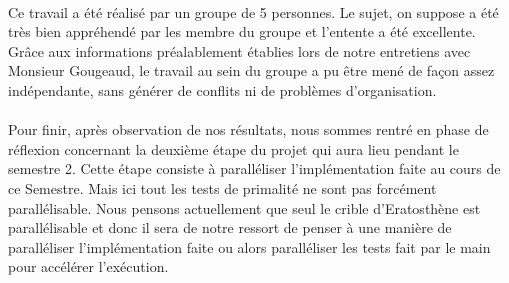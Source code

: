 		\paragraph{} Ce travail a été réalisé par un groupe de 5 personnes. Le sujet, on suppose a été très bien appréhendé par les membre du groupe et l'entente a été excellente. Grâce aux informations préalablement établies lors de notre entretiens avec Monsieur Gougeaud, le travail au sein du groupe a pu être mené de façon assez indépendante, sans générer de conflits ni de problèmes d'organisation.		
		\paragraph{} Pour finir, après observation de nos résultats, nous sommes rentré en phase de réflexion concernant la deuxième étape du projet qui aura lieu pendant le semestre 2. Cette étape consiste à paralléliser l'implémentation faite au cours de ce Semestre. Mais ici tout les tests de primalité ne sont pas forcément parallélisable. Nous pensons actuellement que seul le crible d'Eratosthène est parallélisable et donc il sera de notre ressort de penser à une manière de paralléliser l'implémentation faite ou alors paralléliser les tests fait par le main pour accélérer l'exécution.

